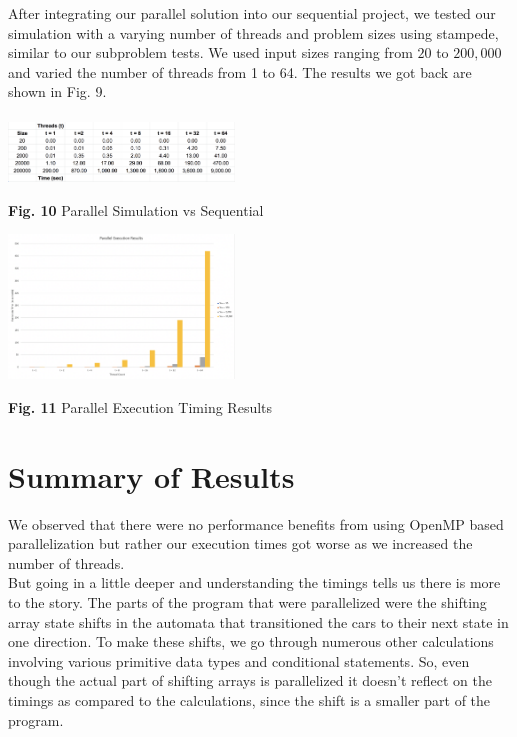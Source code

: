 \documentclass[conference]{IEEEtran}
\begin{document}
\hspace*{.2cm} After integrating our parallel solution into our sequential project, we tested our simulation with a varying number of threads and problem sizes using stampede, similar to our subproblem tests. We used input sizes ranging from $20$ to $200,000$ and varied the number of threads from 1 to 64. The results we got back are shown in Fig. 9. \\ \\

\includegraphics[width=0.45\textwidth]{images/results} \\
\begin{center}
	\textbf{Fig. 10} Parallel Simulation vs Sequential \\
\end{center}


\includegraphics[width=0.45\textwidth]{images/timeVSthreads}
\begin{center}
	\textbf{Fig. 11} Parallel Execution Timing Results \\
\end{center}

\section{Summary of Results}
We observed that there were no performance benefits from using OpenMP based parallelization but rather our execution times got worse as we increased the number of threads. \\

\hspace*{.2cm}But going in a little deeper and understanding the timings tells us there is more to the story. The parts of the program that were parallelized were the shifting array state shifts in the automata that transitioned the cars to their next state in one direction. To make these shifts, we go through numerous other calculations involving various primitive data types and conditional statements. So, even though the actual part of shifting arrays is parallelized it doesn't reflect on the timings as compared to the calculations, since the shift is a smaller part of the program. \\
\end{document}
